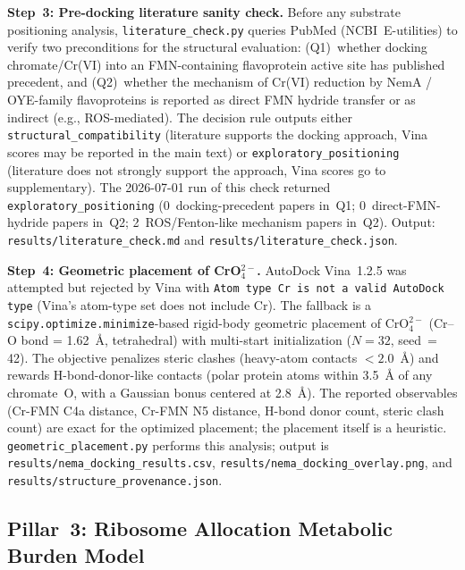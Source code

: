 \documentclass[10pt,twocolumn,letterpaper,
              colorlinks=true,
              linkcolor=blue!70!black,
              citecolor=blue!70!black,
              urlcolor=blue!70!black,
              pdfborder={0 0 0}]{article}
\begin{document}
\medskip
\textbf{Step~3: Pre-docking literature sanity check.}
Before any substrate positioning analysis,
\texttt{literature\_check.py} queries PubMed (NCBI~E-utilities) to
verify two preconditions for the structural evaluation: (Q1)~whether
docking chromate/Cr(VI) into an FMN-containing flavoprotein active site
has published precedent, and (Q2)~whether the mechanism of Cr(VI)
reduction by NemA / OYE-family flavoproteins is reported as direct FMN
hydride transfer or as indirect (e.g., ROS-mediated). The decision rule
outputs either \texttt{structural\_compatibility} (literature supports
the docking approach, Vina scores may be reported in the main text) or
\texttt{exploratory\_positioning} (literature does not strongly support
the approach, Vina scores go to supplementary). The 2026-07-01 run of
this check returned \texttt{exploratory\_positioning} (0~docking-precedent
papers in~Q1; 0~direct-FMN-hydride papers in~Q2; 2~ROS/Fenton-like
mechanism papers in~Q2). Output: \texttt{results/literature\_check.md}
and \texttt{results/literature\_check.json}.

\medskip
\textbf{Step~4: Geometric placement of CrO$_4^{2-}$.}
AutoDock Vina~1.2.5 was attempted but rejected by Vina with
\texttt{Atom type Cr is not a valid AutoDock type} (Vina's atom-type
set does not include Cr). The fallback is a
\texttt{scipy.optimize.minimize}-based rigid-body geometric placement of
CrO$_4^{2-}$ (Cr--O bond = 1.62~\AA{}, tetrahedral) with multi-start
initialization ($N = 32$, seed~= 42). The objective penalizes steric
clashes (heavy-atom contacts ${<}2.0$~\AA{}) and rewards
H-bond-donor-like contacts (polar protein atoms within 3.5~\AA{} of any
chromate~O, with a Gaussian bonus centered at 2.8~\AA{}). The reported
observables (Cr-FMN C4a distance, Cr-FMN N5 distance, H-bond donor
count, steric clash count) are exact for the optimized placement; the
placement itself is a heuristic. \texttt{geometric\_placement.py}
performs this analysis; output is
\texttt{results/nema\_docking\_results.csv},
\texttt{results/nema\_docking\_overlay.png}, and
\texttt{results/structure\_provenance.json}.

\subsection{Pillar~3: Ribosome Allocation Metabolic Burden Model}
\end{document}

